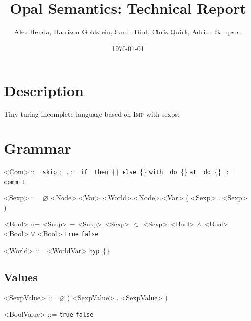 \documentclass{article}
\title{Opal Semantics: Technical Report}
\author{Alex Renda, Harrison Goldstein, Sarah Bird, Chris Quirk, Adrian Sampson}
\date{\today}
\newcommand{\skipcom}{\texttt{skip}}
\newcommand{\seqcom}[2]{#1;\ #2}
\newcommand{\ifcom}[3]{\texttt{if}\ #1\ \texttt{then}\ \{#2\}\ \texttt{else}\ \{#3\}}
\newcommand{\withcom}[2]{\texttt{with}\ #1\ \texttt{do}\ \{#2\}}
\newcommand{\atcom}[2]{\texttt{at}\ #1\ \texttt{do}\ \{#2\}}
\newcommand{\assgncom}[2]{#1\ :=\ #2}
\newcommand{\commitcom}[1]{\texttt{commit}\ #1}
\newcommand{\hypwrld}[1]{\texttt{hyp}\ \{#1\}}
\newcommand{\true}{\texttt{true}}
\newcommand{\false}{\texttt{false}}
\newcommand{\imp}{\textsc{Imp}\xspace}
\begin{document}
\maketitle

\section{Description}

Tiny turing-incomplete language based on \imp with sexps:

\section{Grammar}

\begin{minipage}{0.5\textwidth}
\begin{grammar}
<Com> ::= \skipcom
\alt \seqcom{}{}
\alt {}. := 
\alt \ifcom{}{}{}
\alt \withcom{}{}
\alt \atcom{}{\synt{Com}}
\alt \assgncom{}{}
\alt \commitcom{}

<Sexp> ::= $\varnothing$
\alt <Node>.<Var>
\alt <World>.<Node>.<Var>
\alt ( <Sexp> . <Sexp> )

\end{grammar}
\end{minipage}
\begin{minipage}{0.5\textwidth}
\begin{grammar}

<Bool> ::= <Sexp> = <Sexp>
\alt <Sexp> $\in$ <Sexp>
\alt <Bool> $\land$ <Bool>
\alt <Bool> $\lor$ <Bool>
\alt \true
\alt \false

<World> ::= <WorldVar>
\alt \hypwrld{}
\end{grammar}
\end{minipage}

\subsection{Values}

\begin{minipage}{0.5\textwidth}
\begin{grammar}

<SexpValue> ::= $\varnothing$
\alt ( <SexpValue> . <SexpValue> )

\end{grammar}
\end{minipage}
\begin{minipage}{0.5\textwidth}
\begin{grammar}

<BoolValue> ::= \true
\alt \false

\end{grammar}
\end{minipage}
\end{document}
